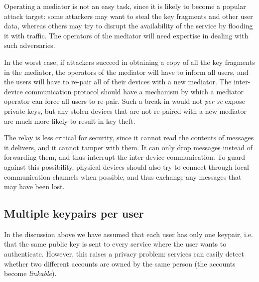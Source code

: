 Operating a mediator is not an easy task, since it is likely to become a popular attack target: some
attackers may want to steal the key fragments and other user data, whereas others may try to disrupt
the availability of the service by flooding it with traffic. The operators of the mediator will need
expertise in dealing with such adversaries.

In the worst case, if attackers succeed in obtaining a copy of all the key fragments in the
mediator, the operators of the mediator will have to inform all users, and the users will have to
re-pair all of their devices with a new mediator. The inter-device communication protocol should
have a mechanism by which a mediator operator can force all users to re-pair. Such a break-in would
not \emph{per se} expose private keys, but any stolen devices that are not re-paired with a new
mediator are much more likely to result in key theft.

The relay is less critical for security, since it cannot read the contents of messages it delivers,
and it cannot tamper with them. It can only drop messages instead of forwarding them, and thus
interrupt the inter-device communication. To guard against this possibility, physical devices should
also try to connect through local communication channels when possible, and thus exchange any
messages that may have been lost.

\subsection{Multiple keypairs per user}\label{sec:identities}

In the discussion above we have assumed that each user has only one keypair, i.e. that the same
public key is sent to every service where the user wants to authenticate. However, this raises a
privacy problem: services can easily detect whether two different accounts are owned by the same
person (the accounts become \emph{linkable}).

